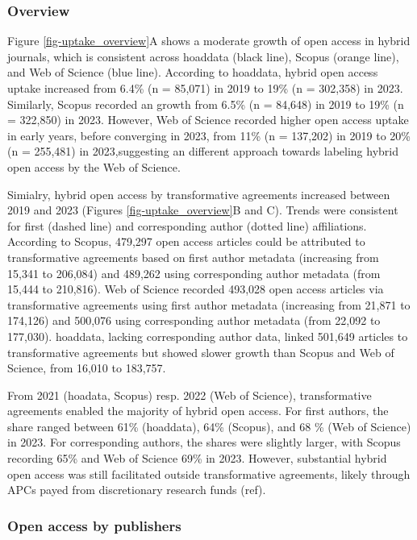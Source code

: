 \documentclass[a4paper,man,floatsintext,longtable,noextraspace,10pt]{apa6}
\begin{document}
\subsubsection{Overview}\label{overview-1}

Figure \ref{fig-uptake_overview}A shows a moderate growth of open access
in hybrid journals, which is consistent across hoaddata (black line),
Scopus (orange line), and Web of Science (blue line). According to
hoaddata, hybrid open access uptake increased from 6.4\% (n = 85,071) in
2019 to 19\% (n = 302,358) in 2023. Similarly, Scopus recorded an growth
from 6.5\% (n = 84,648) in 2019 to 19\% (n = 322,850) in 2023. However,
Web of Science recorded higher open access uptake in early years, before
converging in 2023, from 11\% (n = 137,202) in 2019 to 20\% (n =
255,481) in 2023,suggesting an different approach towards labeling
hybrid open access by the Web of Science.

Simialry, hybrid open access by transformative agreements increased
between 2019 and 2023 (Figures \ref{fig-uptake_overview}B and C). Trends
were consistent for first (dashed line) and corresponding author (dotted
line) affiliations. According to Scopus, 479,297 open access articles
could be attributed to transformative agreements based on first author
metadata (increasing from 15,341 to 206,084) and 489,262 using
corresponding author metadata (from 15,444 to 210,816). Web of Science
recorded 493,028 open access articles via transformative agreements
using first author metadata (increasing from 21,871 to 174,126) and
500,076 using corresponding author metadata (from 22,092 to 177,030).
hoaddata, lacking corresponding author data, linked 501,649 articles to
transformative agreements but showed slower growth than Scopus and Web
of Science, from 16,010 to 183,757.

From 2021 (hoadata, Scopus) resp. 2022 (Web of Science), transformative
agreements enabled the majority of hybrid open access. For first
authors, the share ranged between 61\% (hoaddata), 64\% (Scopus), and 68
\% (Web of Science) in 2023. For corresponding authors, the shares were
slightly larger, with Scopus recording 65\% and Web of Science 69\% in
2023. However, substantial hybrid open access was still facilitated
outside transformative agreements, likely through APCs payed from
discretionary research funds (ref).

\subsubsection{Open access by
publishers}\label{open-access-by-publishers}
\end{document}
